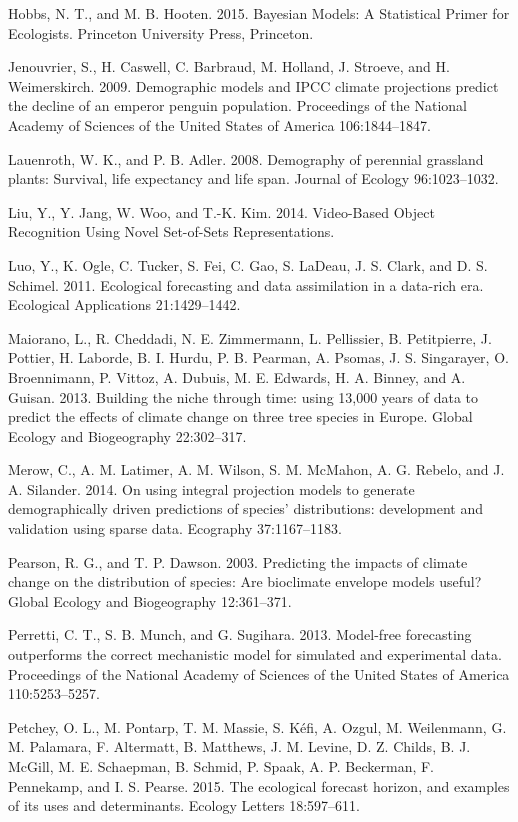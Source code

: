 \documentclass[12pt,]{article}
\begin{document}
Hobbs, N. T., and M. B. Hooten. 2015. Bayesian Models: A Statistical
Primer for Ecologists. Princeton University Press, Princeton.

Jenouvrier, S., H. Caswell, C. Barbraud, M. Holland, J. Stroeve, and H.
Weimerskirch. 2009. Demographic models and IPCC climate projections
predict the decline of an emperor penguin population. Proceedings of the
National Academy of Sciences of the United States of America
106:1844--1847.

Lauenroth, W. K., and P. B. Adler. 2008. Demography of perennial
grassland plants: Survival, life expectancy and life span. Journal of
Ecology 96:1023--1032.

Liu, Y., Y. Jang, W. Woo, and T.-K. Kim. 2014. Video-Based Object
Recognition Using Novel Set-of-Sets Representations.

Luo, Y., K. Ogle, C. Tucker, S. Fei, C. Gao, S. LaDeau, J. S. Clark, and
D. S. Schimel. 2011. Ecological forecasting and data assimilation in a
data-rich era. Ecological Applications 21:1429--1442.

Maiorano, L., R. Cheddadi, N. E. Zimmermann, L. Pellissier, B.
Petitpierre, J. Pottier, H. Laborde, B. I. Hurdu, P. B. Pearman, A.
Psomas, J. S. Singarayer, O. Broennimann, P. Vittoz, A. Dubuis, M. E.
Edwards, H. A. Binney, and A. Guisan. 2013. Building the niche through
time: using 13,000 years of data to predict the effects of climate
change on three tree species in Europe. Global Ecology and Biogeography
22:302--317.

Merow, C., A. M. Latimer, A. M. Wilson, S. M. McMahon, A. G. Rebelo, and
J. A. Silander. 2014. On using integral projection models to generate
demographically driven predictions of species' distributions:
development and validation using sparse data. Ecography 37:1167--1183.

Pearson, R. G., and T. P. Dawson. 2003. Predicting the impacts of
climate change on the distribution of species: Are bioclimate envelope
models useful? Global Ecology and Biogeography 12:361--371.

Perretti, C. T., S. B. Munch, and G. Sugihara. 2013. Model-free
forecasting outperforms the correct mechanistic model for simulated and
experimental data. Proceedings of the National Academy of Sciences of
the United States of America 110:5253--5257.

Petchey, O. L., M. Pontarp, T. M. Massie, S. Kéfi, A. Ozgul, M.
Weilenmann, G. M. Palamara, F. Altermatt, B. Matthews, J. M. Levine, D.
Z. Childs, B. J. McGill, M. E. Schaepman, B. Schmid, P. Spaak, A. P.
Beckerman, F. Pennekamp, and I. S. Pearse. 2015. The ecological forecast
horizon, and examples of its uses and determinants. Ecology Letters
18:597--611.
\end{document}
